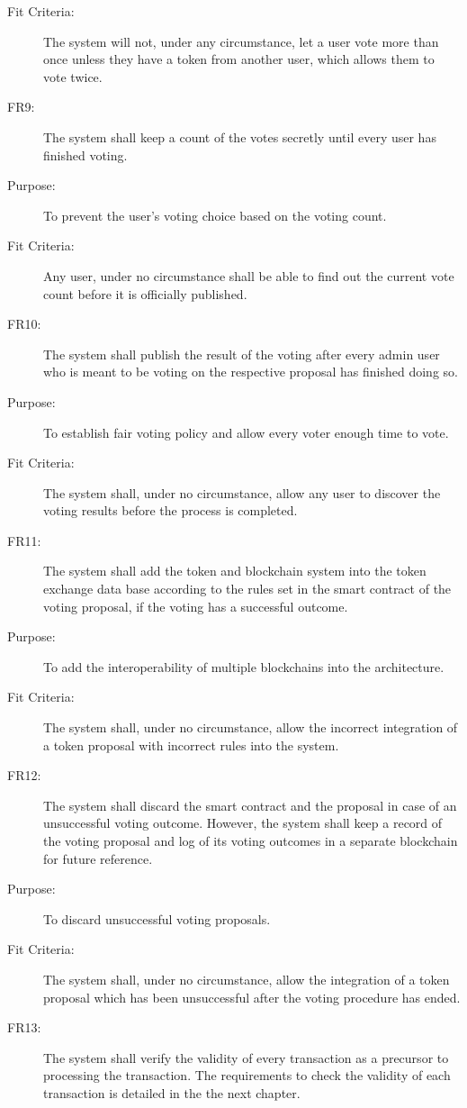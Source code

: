 \documentclass[a4paper,twoside,phd]{BYUPhys}
\begin{document}
\begin{description}
\item[Fit Criteria:] The system will not, under any circumstance, let a user vote more than once unless they have a token from another user, which allows them to vote twice.
\\
\item[FR9:] The system shall keep a count of the votes secretly until every user has finished voting.
\item[Purpose:] To prevent the user's voting choice based on the voting count.
\item[Fit Criteria:] Any user, under no circumstance shall be able to find out the current vote count before it is officially published.
\\
\item[FR10:] The system shall publish the result of the voting after every admin user who is meant to be voting on the respective proposal has finished doing so.
\item[Purpose:] To establish fair voting policy and allow every voter enough time to vote.
\item[Fit Criteria:] The system shall, under no circumstance, allow any user to discover the voting results before the process is completed.
\\
\item[FR11:] The system shall add the token and blockchain system into the token exchange data base according to the rules set in the smart contract of the voting proposal, if the voting has a successful outcome.
\item[Purpose:] To add the interoperability of multiple blockchains into the architecture.
\item[Fit Criteria:] The system shall, under no circumstance, allow the incorrect integration of a token proposal with incorrect rules into the system.
\\
\item[FR12:] The system shall discard the smart contract and the proposal in case of an unsuccessful voting outcome. However, the system shall keep a record of the voting proposal and log of its voting outcomes in a separate blockchain for future reference.
\item[Purpose:] To discard unsuccessful voting proposals.
\item[Fit Criteria:] The system shall, under no circumstance, allow the integration of a token proposal which has been unsuccessful after the voting procedure has ended.
\\
\item[FR13:] The system shall verify the validity of every transaction as a precursor to processing the transaction. The requirements to check the validity of each transaction is detailed in the the next chapter.

\end{description}
\end{document}
